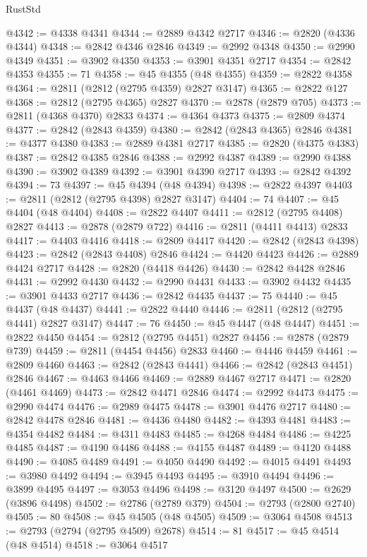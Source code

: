 \begin{lexlean}{RustStd}
\begin{coremodule}
{\begin{coremodule}
{{{{{{{{{{{{{{{{{{{{{{{{{{{{{{{{{@4342 := @4338 @4341
@4344 := @2889 @4342 @2717
@4346 := @2820 (@4336 @4344)
@4348 := @2842 @4346 @2846
@4349 := @2992 @4348
@4350 := @2990 @4349
@4351 := @3902 @4350
@4353 := @3901 @4351 @2717
@4354 := @2842 @4353
@4355 := 71
@4358 := @45 @4355 (@48 @4355)
@4359 := @2822 @4358
@4364 := @2811 (@2812 (@2795 @4359) @2827 @3147)
@4365 := @2822 @127
@4368 := @2812 (@2795 @4365) @2827
@4370 := @2878 (@2879 @705)
@4373 := @2811 (@4368 @4370) @2833
@4374 := @4364 @4373
@4375 := @2809 @4374
@4377 := @2842 (@2843 @4359)
@4380 := @2842 (@2843 @4365) @2846
@4381 := @4377 @4380
@4383 := @2889 @4381 @2717
@4385 := @2820 (@4375 @4383)
@4387 := @2842 @4385 @2846
@4388 := @2992 @4387
@4389 := @2990 @4388
@4390 := @3902 @4389
@4392 := @3901 @4390 @2717
@4393 := @2842 @4392
@4394 := 73
@4397 := @45 @4394 (@48 @4394)
@4398 := @2822 @4397
@4403 := @2811 (@2812 (@2795 @4398) @2827 @3147)
@4404 := 74
@4407 := @45 @4404 (@48 @4404)
@4408 := @2822 @4407
@4411 := @2812 (@2795 @4408) @2827
@4413 := @2878 (@2879 @722)
@4416 := @2811 (@4411 @4413) @2833
@4417 := @4403 @4416
@4418 := @2809 @4417
@4420 := @2842 (@2843 @4398)
@4423 := @2842 (@2843 @4408) @2846
@4424 := @4420 @4423
@4426 := @2889 @4424 @2717
@4428 := @2820 (@4418 @4426)
@4430 := @2842 @4428 @2846
@4431 := @2992 @4430
@4432 := @2990 @4431
@4433 := @3902 @4432
@4435 := @3901 @4433 @2717
@4436 := @2842 @4435
@4437 := 75
@4440 := @45 @4437 (@48 @4437)
@4441 := @2822 @4440
@4446 := @2811 (@2812 (@2795 @4441) @2827 @3147)
@4447 := 76
@4450 := @45 @4447 (@48 @4447)
@4451 := @2822 @4450
@4454 := @2812 (@2795 @4451) @2827
@4456 := @2878 (@2879 @739)
@4459 := @2811 (@4454 @4456) @2833
@4460 := @4446 @4459
@4461 := @2809 @4460
@4463 := @2842 (@2843 @4441)
@4466 := @2842 (@2843 @4451) @2846
@4467 := @4463 @4466
@4469 := @2889 @4467 @2717
@4471 := @2820 (@4461 @4469)
@4473 := @2842 @4471 @2846
@4474 := @2992 @4473
@4475 := @2990 @4474
@4476 := @2989 @4475
@4478 := @3901 @4476 @2717
@4480 := @2842 @4478 @2846
@4481 := @4436 @4480
@4482 := @4393 @4481
@4483 := @4354 @4482
@4484 := @4311 @4483
@4485 := @4268 @4484
@4486 := @4225 @4485
@4487 := @4190 @4486
@4488 := @4155 @4487
@4489 := @4120 @4488
@4490 := @4085 @4489
@4491 := @4050 @4490
@4492 := @4015 @4491
@4493 := @3980 @4492
@4494 := @3945 @4493
@4495 := @3910 @4494
@4496 := @3899 @4495
@4497 := @3053 @4496
@4498 := @3120 @4497
@4500 := @2629 (@3896 @4498)
@4502 := @2786 (@2789 @379)
@4504 := @2793 (@2800 @2740)
@4505 := 80
@4508 := @45 @4505 (@48 @4505)
@4509 := @3064 @4508
@4513 := @2793 (@2794 (@2795 @4509) @2678)
@4514 := 81
@4517 := @45 @4514 (@48 @4514)
@4518 := @3064 @4517
}}}}}}}}}}}}}}}}}}}}}}}}}}}}}}}}}
\end{coremodule}}
\end{coremodule}
\end{lexlean}

